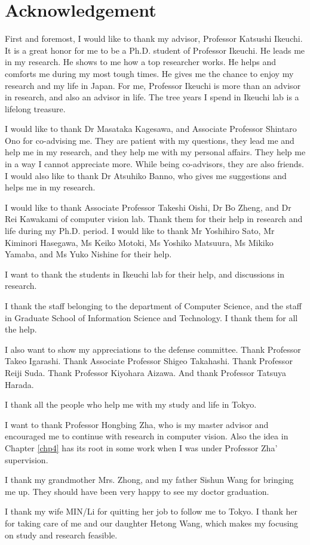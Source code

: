 

\chapter*{Acknowledgement}
%
\thispagestyle{empty}%
First and foremost, I would like to thank my advisor, Professor Katsushi Ikeuchi. It is a great honor for me to be a Ph.D. student of Professor Ikeuchi. He leads me in my research. He shows to me how a top researcher works. He helps and comforts me during my most tough times. He gives me the chance to enjoy my research and my life in Japan. For me, Professor Ikeuchi is more than an advisor in research, and also an advisor in life. The tree years I spend in Ikeuchi lab is a lifelong treasure.

I would like to thank Dr Masataka Kagesawa, and Associate Professor Shintaro Ono for co-advising me. They are patient with my questions, they lead me and help me in my research, and they help me with my personal affairs. They help me in a way I cannot appreciate more. While being co-advisors, they are also friends. I would also like to thank Dr Atsuhiko Banno, who gives me suggestions and helps me in my research.

I would like to thank Associate Professor Takeshi Oishi, Dr Bo Zheng, and Dr Rei Kawakami of computer vision lab. Thank them for their help in research and life during my Ph.D. period. I would like to thank Mr Yoshihiro Sato, Mr Kiminori Hasegawa, Ms Keiko Motoki,  Ms Yoshiko Matsuura, Ms Mikiko Yamaba, and Ms Yuko Nishine for their help.

I want to thank the students in Ikeuchi lab for their help, and discussions in research.

I thank the staff belonging to the department of Computer Science, and the staff in Graduate School of Information Science and Technology. I thank them for all the help.


I also want to show my appreciations to the defense  committee. Thank Professor Takeo Igarashi. Thank Associate Professor Shigeo Takahashi. Thank Professor Reiji Suda. Thank  Professor Kiyohara Aizawa. And thank Professor Tatsuya Harada.

I thank all the people who help me with my study and life in Tokyo.

I want to thank Professor Hongbing Zha, who is my master advisor and encouraged me to continue with research in computer vision. Also the idea in Chapter \ref{chp4} has its root in some work when I was under Professor Zha' supervision.

I thank my grandmother Mrs. Zhong, and my father Sishun Wang for bringing me up. They should have been very happy to see my doctor graduation.

I thank my wife MIN/Li for quitting her job to follow me to Tokyo. I thank her for taking care of me and our daughter Hetong Wang, which makes my focusing on study and research feasible.
\cleardoublepage
